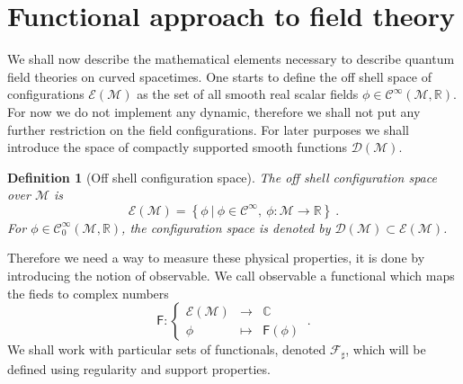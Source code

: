 \documentclass[11pt]{book}
\newcommand{\Ccal}{\mathcal{C}}
\newcommand{\Dcal}{\mathcal{D}}
\newcommand{\Ecal}{\mathcal{E}}
\newcommand{\Fcal}{\mathcal{F}}
\newcommand{\Mcal}{\mathcal{M}}
\newcommand{\Cbb}{\mathbb{C}}
\newcommand{\Rbb}{\mathbb{R}}
\newcommand{\Fsf}{\mathsf{F}}
\theoremstyle{break}
\newtheorem{definition}{Definition}
\begin{document}


\section{Functional approach to field theory}

We shall now describe the mathematical elements necessary to describe quantum field theories on curved spacetimes. One starts to define the off shell space of configurations $\Ecal(\Mcal)$ as the set of all smooth real scalar fields $\phi \in \Ccal^\infty\left(\Mcal,\Rbb\right)$. For now we do not implement any dynamic, therefore we shall not put any further restriction on the field configurations. For later purposes we shall introduce the space of compactly supported smooth functions $\Dcal(\Mcal)$.\par%
%
\begin{definition}[Off shell configuration space]
The off shell configuration space over $\Mcal$ is 
%
\begin{equation*}
\Ecal(\Mcal) = \left\{ \phi \ \bigg| \ \phi \in \Ccal^\infty, \  \phi : \Mcal \to \Rbb \right\} \ .
\end{equation*}
%
For $\phi \in \Ccal^\infty_0(\Mcal,\Rbb)$, the configuration space is denoted by $\Dcal(\Mcal) \subset \Ecal(\Mcal)$.
\end{definition}


\bigskip


Therefore we need a way to measure these physical properties, it is done by introducing the notion of observable. We call observable a functional which maps the fieds to complex numbers%
%
\begin{equation*}
\Fsf : \left\{
\begin{array}{ccc}
\Ecal(\Mcal) & \to     & \Cbb \\
\phi  & \mapsto & \Fsf(\phi)
\end{array}
\right. \ .
\end{equation*}
%
We shall work with particular sets of functionals, denoted $\Fcal_\sharp$, which will be defined using regularity and support properties. \par%


\end{document}
